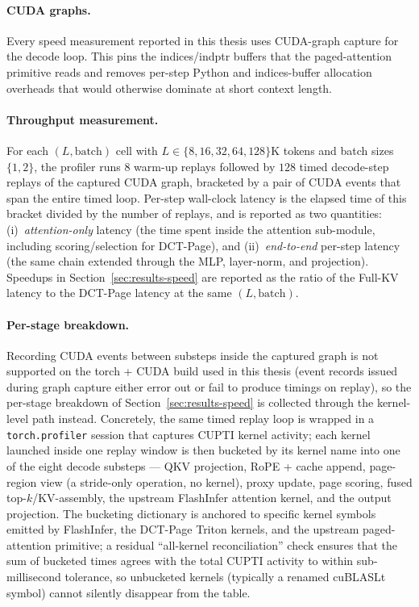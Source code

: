 \paragraph{CUDA graphs.}
Every speed measurement reported in this thesis uses CUDA-graph
capture for the decode loop.  This pins the indices/indptr buffers
that the paged-attention primitive reads and removes per-step Python
and indices-buffer allocation overheads that would otherwise dominate
at short context length.

\paragraph{Throughput measurement.}
For each $(L, \text{batch})$ cell with $L \in \{8, 16, 32, 64, 128\}\text{K}$
tokens and batch sizes $\{1, 2\}$, the profiler runs $8$ warm-up
replays followed by $128$ timed decode-step replays of the captured
CUDA graph, bracketed by a pair of CUDA events that span the entire
timed loop.  Per-step wall-clock latency is the elapsed time of this
bracket divided by the number of replays, and is reported as two
quantities: (i)~\emph{attention-only} latency (the time spent inside
the attention sub-module, including scoring/selection for DCT-Page),
and (ii)~\emph{end-to-end} per-step latency (the same chain extended
through the MLP, layer-norm, and projection).
Speedups in Section~\ref{sec:results-speed} are reported as the ratio
of the Full-KV latency to the DCT-Page latency at the same
$(L, \text{batch})$.

\paragraph{Per-stage breakdown.}
Recording CUDA events between substeps inside the captured graph is
not supported on the torch + CUDA build used in this thesis (event
records issued during graph capture either error out or fail to
produce timings on replay), so the per-stage breakdown of
Section~\ref{sec:results-speed} is collected through the kernel-level
path instead.  Concretely, the same timed replay loop is wrapped in a
\texttt{torch.profiler} session that captures CUPTI kernel activity;
each kernel launched inside one replay window is then bucketed by
its kernel name into one of the eight decode substeps --- QKV
projection, RoPE + cache append, page-region view (a stride-only
operation, no kernel), proxy update, page scoring, fused
top-$k$/KV-assembly, the upstream FlashInfer attention kernel, and
the output projection.  The bucketing dictionary is anchored to
specific kernel symbols emitted by FlashInfer, the DCT-Page Triton
kernels, and the upstream paged-attention primitive; a residual
``all-kernel reconciliation'' check ensures that the sum of bucketed
times agrees with the total CUPTI activity to within sub-millisecond
tolerance, so unbucketed kernels (typically a renamed cuBLASLt
symbol) cannot silently disappear from the table.

